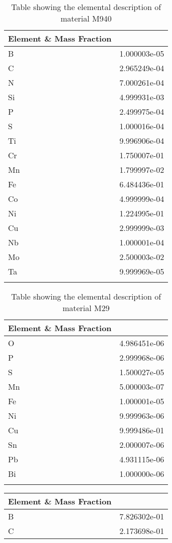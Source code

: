 \begin{centering}
\begin{longtable}[ht!]
{ p{} | p{} }
\hline
Element \& Mass Fraction\\
\hline
B &  1.000003e-05\\
C &  2.965249e-04\\
N &  7.000261e-04\\
Si &  4.999931e-03\\
P &  2.499975e-04\\
S &  1.000016e-04\\
Ti &  9.996906e-04\\
Cr &  1.750007e-01\\
Mn &  1.799997e-02\\
Fe &  6.484436e-01\\
Co &  4.999999e-04\\
Ni &  1.224995e-01\\
Cu &  2.999999e-03\\
Nb &  1.000001e-04\\
Mo &  2.500003e-02\\
Ta &  9.999969e-05\\

\caption{Table showing the elemental description of material M940}
\label{table:material_EPPFW}
\end{longtable}
\clearpage

\begin{longtable}[ht!]
{ p{} | p{} }
\hline
Element \& Mass Fraction\\
\hline
O &  4.986451e-06\\
P &  2.999968e-06\\
S &  1.500027e-05\\
Mn &  5.000003e-07\\
Fe &  1.000001e-05\\
Ni &  9.999963e-06\\
Cu &  9.999486e-01\\
Sn &  2.000007e-06\\
Pb &  4.931115e-06\\
Bi &  1.000000e-06\\

\caption{Table showing the elemental description of material M29}
\label{table:material_M29}
\end{longtable}
\clearpage


\begin{longtable}[ht!]
{ p{} | p{} }
\hline
Element \& Mass Fraction\\
\hline
B &  7.826302e-01\\
C &  2.173698e-01\\


\end{longtable}
\end{centering}
